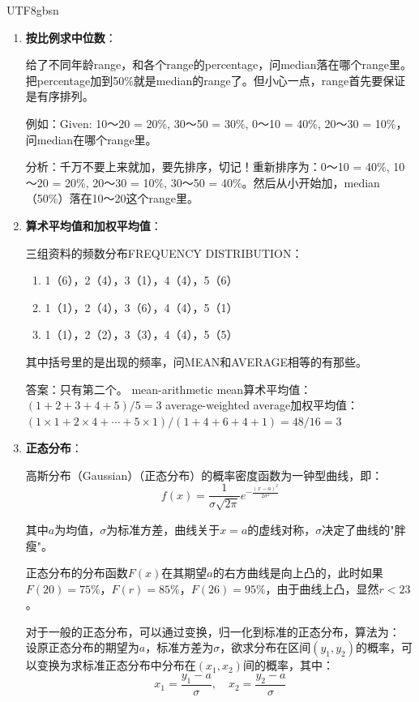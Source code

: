 \documentclass[12pt]{article}
\begin{document}
\begin{CJK*}{UTF8}{gbsn}
\begin{enumerate}
    \item \textbf{按比例求中位数}：
    
    给了不同年龄range，和各个range的percentage，问median落在哪个range里。把percentage加到50\%就是median的range了。但小心一点，range首先要保证是有序排列。
    
    例如：Given: 10～20 = 20\%, 30～50 = 30\%, 0～10 = 40\%, 20～30 = 10\%，问median在哪个range里。
    
    分析：千万不要上来就加，要先排序，切记！重新排序为：0～10 = 40\%, 10～20 = 20\%, 20～30 = 10\%, 30～50 = 40\%。然后从小开始加，median（50\%）落在10～20这个range里。
    
    \item \textbf{算术平均值和加权平均值}：
    
    三组资料的频数分布FREQUENCY DISTRIBUTION：
    \begin{enumerate}
        \item 1（6），2（4），3（1），4（4），5（6）
        \item 1（1），2（4），3（6），4（4），5（1）
        \item 1（1），2（2），3（3），4（4），5（5）
    \end{enumerate}
    
    其中括号里的是出现的频率，问MEAN和AVERAGE相等的有那些。
    
    答案：只有第二个。
    mean-arithmetic mean算术平均值：$(1+2+3+4+5)/5 = 3$
    average-weighted average加权平均值：$(1 \times 1+2 \times 4+\cdots+5 \times 1)/(1+4+6+4+1)=48/16=3$
    
    \item \textbf{正态分布}：
    
    高斯分布（Gaussian）（正态分布）的概率密度函数为一钟型曲线，即：
    $$f(x) = \frac{1}{\sigma \sqrt{2\pi}} e^{-\frac{(x-a)^2}{2\sigma^2}}$$
    
    其中$a$为均值，$\sigma$为标准方差，曲线关于$x=a$的虚线对称，$\sigma$决定了曲线的"胖瘦"。
    
    正态分布的分布函数$F(x)$在其期望$a$的右方曲线是向上凸的，此时如果$F(20)=75\%$，$F(r)=85\%$，$F(26)=95\%$，由于曲线上凸，显然$r < 23$。
    
    对于一般的正态分布，可以通过变换，归一化到标准的正态分布，算法为：
    设原正态分布的期望为$a$，标准方差为$\sigma$，欲求分布在区间$(y_1, y_2)$的概率，可以变换为求标准正态分布中分布在$(x_1, x_2)$间的概率，其中：
    $$x_1 = \frac{y_1 - a}{\sigma}, \quad x_2 = \frac{y_2 - a}{\sigma}$$
\end{enumerate}


\end{CJK*}
\end{document}
